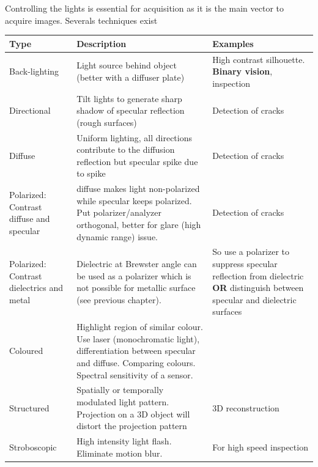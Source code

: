 \documentclass[
  a4paper,
  ,captions=tableheading
]{scrartcl}
\begin{document}
Controlling the lights is essential for acquisition as it is the main
vector to acquire images. Severals techniques exist

\begin{longtable}[]{@{}
  >{\raggedright\arraybackslash}p{}
  >{\raggedright\arraybackslash}p{}
  >{\raggedleft\arraybackslash}p{}@{}}
\toprule\noalign{}
\begin{minipage}[b]{\linewidth}\raggedright
Type
\end{minipage} & \begin{minipage}[b]{\linewidth}\raggedright
Description
\end{minipage} & \begin{minipage}[b]{\linewidth}\raggedleft
Examples
\end{minipage} \\
\midrule\noalign{}
\endhead
\bottomrule\noalign{}
\endlastfoot
Back-lighting & Light source behind object (better with a diffuser
plate) & High contrast silhouette. \textbf{Binary vision}, inspection \\
Directional & Tilt lights to generate sharp shadow of specular
reflection (rough surfaces) & Detection of cracks \\
Diffuse & Uniform lighting, all directions contribute to the diffusion
reflection but specular spike due to spike & Detection of cracks \\
Polarized: Contrast diffuse and specular & diffuse makes light
non-polarized while specular keeps polarized. Put polarizer/analyzer
orthogonal, better for glare (high dynamic range) issue. & Detection of
cracks \\
Polarized: Contrast dielectrics and metal & Dielectric at Brewster angle
can be used as a polarizer which is not possible for metallic surface
(see previous chapter). & So use a polarizer to suppress specular
reflection from dielectric \textbf{OR} distinguish between specular and
dielectric surfaces \\
Coloured & Highlight region of similar colour. Use laser (monochromatic
light), differentiation between specular and diffuse. Comparing colours.
Spectral sensitivity of a sensor. & \\
Structured & Spatially or temporally modulated light pattern. Projection
on a 3D object will distort the projection pattern & 3D
reconstruction \\
Stroboscopic & High intensity light flash. Eliminate motion blur. & For
high speed inspection \\
\end{longtable}
\end{document}

